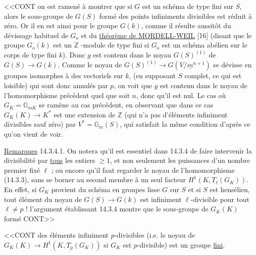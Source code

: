 
<<CONT on est ramené à montrer que si $G$ est un schéma de type fini sur $S$, alors le sous-groupe de $G(S)$ formé des points infiniments divisibles est réduit à zéro. Or il en est ainsi pour le groupe $G(k)$, comme il résulte aussitôt du dévissage habituel de $G_o$ et du \underline{théorème de MORDELL-WEIL} [16] (disant que le groupe $G_o(k)$ est un $\mathbb{Z}$ -module de type fini si $G_o$ est un schéma abélien sur le corps de type fini $k$). Donc $g$ est contenu dans le noyau $G(S)^{(1)}$ de $G(S) \longrightarrow G(k)$. Comme le noyau de $G(S)^{(1)} \longrightarrow G(V/\underline{m}^{n+1})$ se dévisse en groupes isomorphes à des vectoriels sur $k$, (en supposant $S$ complet, ce qui est loisible) qui sont donc annulés par $p$, on voit que $g$ est contenu dans le noyau de l'homomorphisme précédent quel que soit $n$, donc qu'il est nul. Le cas où $G_K = \mathbb{G}_{mK}$ se ramène au cas précédent, en observant que dans ce cas $G_K(K) \longrightarrow K^*$ est une extension de $\mathbb{Z}$ (qui n'a pas d'éléments infiniment divisibles sauf zéro) par $V^* = \mathbb{G}_m(S)$, qui satisfait la même condition d'après ce qu'on vient de voir.

\underline{Remarques} 14.3.4.1. On notera qu'il est essentiel dans 14.3.4 de faire intervenir la divisibilité par \underline{tous} les entiers $\geq 1$, et non seulement les puissances d'un nombre premier fixé $\ell$ ; ou encore qu'il faut regarder le noyau de l'homomorphisme (14.3.3), sans se borner au second membre à un seul facteur $H^1(K, T_\ell(G_K))$. En effet, si $G_K$ provient du schéma en groupes lisse $G$ sur $S$ et si $S$ est hensélien, tout élément du noyau de $G(S) \longrightarrow G(k)$ est infiniment $\ell$-divisible pour tout $\ell \neq p$ ! l'argument établissant 14.3.4 montre que le sous-groupe de $G_K(K)$ formé CONT>>



<<CONT des éléments infiniment $p$-divisibles (i.e. le noyau de $G_K(K) \to H^1(K,T_p(G_K))$ si $G_K$ est $p$-divisible) est un groupe \underline{fini}.

